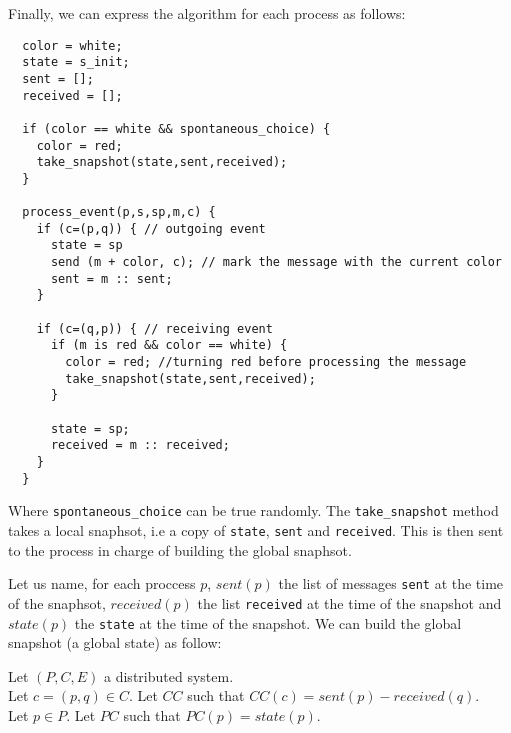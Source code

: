 \documentclass{article}
\begin{document}

    
Finally, we can express the algorithm for each process as follows:
\begin{lstlisting}
  color = white;
  state = s_init;
  sent = [];
  received = [];

  if (color == white && spontaneous_choice) {
    color = red;
    take_snapshot(state,sent,received);
  }

  process_event(p,s,sp,m,c) {
    if (c=(p,q)) { // outgoing event
      state = sp
      send (m + color, c); // mark the message with the current color
      sent = m :: sent;
    }

    if (c=(q,p)) { // receiving event
      if (m is red && color == white) {
        color = red; //turning red before processing the message
        take_snapshot(state,sent,received);
      }
      
      state = sp;
      received = m :: received;
    }
  }
\end{lstlisting}

Where \lstinline{spontaneous_choice} can be true randomly.
The \lstinline{take_snapshot} method takes a local snaphsot, i.e a copy of \lstinline{state}, \lstinline{sent} and \lstinline{received}. This is then sent to the process in charge of building the global snaphsot.

Let us name, for each proccess $p$, $\mathit{sent}(p)$ the list of messages \lstinline{sent} at the time of the snaphsot, $\mathit{received}(p)$ the list \lstinline{received} at the time of the snapshot and $\mathit{state}(p)$ the \lstinline{state} at the time of the snapshot.
We can build the global snapshot (a global state) as follow:

Let $(P,C,E)$ a distributed system.\\
Let $c=(p,q)\in C$. Let $CC$ such that $CC(c) = \mathit{sent}(p) - \mathit{received}(q)$.\\
Let $p\in P$. Let $PC$ such that $PC(p)=\mathit{state}(p)$.
\end{document}
